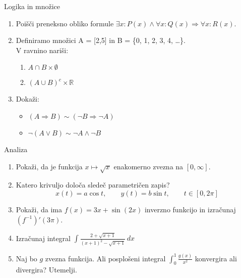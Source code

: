 \begin{frame}{Logika in množice}
	\begin{enumerate}
		\item
		Poišči preneksno obliko formule 
		$\exists x :P(x) \land \forall x: Q(x) \Rightarrow \forall x: R(x) $.
		\item 
		Definiramo množici A = [2,5]  in  B = \{0, 1, 2, 3, 4, \dots\}.\\
		V ravnino nariši:
		\begin{enumerate}
		   \item $ A \cap B \times \emptyset$
		   \item $ (A \cup B)^c  \times \mathbb{R} $
		\end{enumerate}
		\item
		Dokaži:
		\begin{itemize}
			\item $ (A \Rightarrow B) \sim  (\lnot B \Rightarrow \lnot A )$
			\item $\lnot (A \lor B) \sim \lnot A \land \lnot B $
		\end{itemize}
	\end{enumerate}
\end{frame}

\begin{frame}{Analiza}
	\begin{enumerate}
		\item
		Pokaži, da je funkcija $ x \mapsto \sqrt{x}$  enakomerno zvezna na $ [0, \infty].$
		\item 
		Katero krivuljo določa sledeč parametričen zapis?
		$$
		   x(t) = a \cos t, \qquad %
		   y(t) = b \sin t, \qquad %
		   t \in [0, 2 \pi]
		$$ 
		\item
		Pokaži, da ima $f(x) = 3x + \sin(2x)$ inverzno funkcijo in izračunaj $ (f^{-1})'(3\pi)$.
		\item
		Izračunaj integral 
		$ \displaystyle {\int
		 {\frac{2+\sqrt{x+1}}{(x+1)^2-\sqrt{x+1}}}} \, dx$ 
		\item 
		Naj bo $g$ zvezna funkcija. Ali posplošeni integral 
		$ \int_{0}^{1}  {\frac{g(x)}{x^2}} $
		konvergira ali divergira? Utemelji.
	\end{enumerate}
\end{frame}

